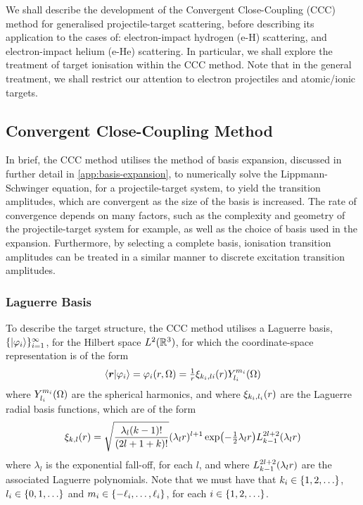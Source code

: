 \documentclass[draft]{article}
\begin{document}

We shall describe the development of the Convergent Close-Coupling (CCC) method
for generalised projectile-target scattering, before describing its application
to the cases of: electron-impact hydrogen (e-H) scattering, and electron-impact
helium (e-He) scattering.
In particular, we shall explore the treatment of target ionisation within the CCC
method.
Note that in the general treatment, we shall restrict our attention to electron
projectiles and atomic/ionic targets.

\subsection{Convergent Close-Coupling Method}
\label{sec:ccc-method}

In brief, the CCC method utilises the method of basis expansion, discussed in
further detail in \autoref{app:basis-expansion}, to numerically solve the
Lippmann-Schwinger equation, for a projectile-target system, to yield the
transition amplitudes, which are convergent as the size of the basis is
increased.
The rate of convergence depends on many factors, such as the complexity and
geometry of the projectile-target system for example, as well as the choice of
basis used in the expansion.
Furthermore, by selecting a complete basis, ionisation transition amplitudes can
be treated in a similar manner to discrete excitation transition amplitudes.

\subsubsection{Laguerre Basis}
\label{sec:laguerre-basis}

To describe the target structure, the CCC method utilises a Laguerre basis,
$\lbrace\ket{\varphi_{i}}\rbrace_{i = 1}^{\infty}$, for the Hilbert space
$L^{2}(\mathbb{R}^{3})$, for which the coordinate-space representation is of the
form
\begin{equation}
  \label{eq:laguerre-basis}
  \bra{\boldsymbol{r}}
  \ket{\varphi_{i}}
  =
  \varphi_{i}(r, \Omega)
  =
  \tfrac{1}{r}
  \xi_{k_{i}, l{i}}(r)
  Y_{l_{i}}^{m_{i}}(\Omega)
\end{equation}
where $Y_{l_{i}}^{m_{i}}(\Omega)$ are the spherical harmonics, and where
$\xi_{k_{i}, l_{i}}(r)$ are the Laguerre radial basis functions, which are of
the form
\begin{equation}
  \label{eq:laguerre-radial-basis}
  \xi_{k, l}\lr{r}
  =
  \sqrt
  {
    \dfrac
    {
      \lambda_{l}
      \lr{k - 1}!
    }
    {
      \lr{2l + 1 + k}!
    }
  }
  \lr{\lambda_{l} r}^{l + 1}
  \exponential\lr[\big]{- \tfrac{1}{2} \lambda_{l} r}
  L_{k - 1}^{2l + 2}\lr{\lambda_{l} r}
\end{equation}
where $\lambda_{l}$ is the exponential fall-off, for each $l$, and where
$L_{k - 1}^{2l + 2}(\lambda_{l} r)$ are the associated Laguerre polynomials.
Note that we must have that
$k_{i} \in \lrset{1, 2, \dotsc}$,
$l_{i} \in \lrset{0, 1, \dotsc}$ and
$m_{i} \in \lbrace-\ell_{i}, \dotsc, \ell_{i}\rbrace$, for each
$i \in \lrset{1, 2, \dotsc}$.
\end{document}
